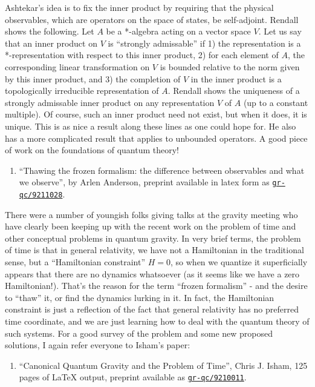 \documentclass{article}
\def\tightlist{}
\begin{document}
Ashtekar's idea is to fix the inner product by requiring that the
physical observables, which are operators on the space of states, be
self-adjoint. Rendall shows the following. Let \(A\) be a *-algebra
acting on a vector space \(V\). Let us say that an inner product on
\(V\) is ``strongly admissable'' if 1) the representation is a
*-representation with respect to this inner product, 2) for each element
of \(A\), the corresponding linear transformation on \(V\) is bounded
relative to the norm given by this inner product, and 3) the completion
of \(V\) in the inner product is a topologically irreducible
representation of \(A\). Rendall shows the uniqueness of a strongly
admissable inner product on any representation \(V\) of \(A\) (up to a
constant multiple). Of course, such an inner product need not exist, but
when it does, it is unique. This is as nice a result along these lines
as one could hope for. He also has a more complicated result that
applies to unbounded operators. A good piece of work on the foundations
of quantum theory!

\begin{enumerate}
\def\labelenumi{\arabic{enumi})}
\setcounter{enumi}{3}
\tightlist
\item
  ``Thawing the frozen formalism: the difference between observables and
  what we observe'', by Arlen Anderson, preprint available in latex form
  as
  \href{http://xxx.lanl.gov/abs/gr-qc/9211028}{\texttt{gr-qc/9211028}}.
\end{enumerate}

There were a number of youngish folks giving talks at the gravity
meeting who have clearly been keeping up with the recent work on the
problem of time and other conceptual problems in quantum gravity. In
very brief terms, the problem of time is that in general relativity, we
have not a Hamiltonian in the traditional sense, but a ``Hamiltonian
constraint'' \(H = 0\), so when we quantize it superficially appears
that there are no dynamics whatsoever (as it seems like we have a zero
Hamiltonian!). That's the reason for the term ``frozen formalism'' - and
the desire to ``thaw'' it, or find the dynamics lurking in it. In fact,
the Hamiltonian constraint is just a reflection of the fact that general
relativity has no preferred time coordinate, and we are just learning
how to deal with the quantum theory of such systems. For a good survey
of the problem and some new proposed solutions, I again refer everyone
to Isham's paper:

\begin{enumerate}
\def\labelenumi{\arabic{enumi})}
\setcounter{enumi}{4}
\tightlist
\item
  ``Canonical Quantum Gravity and the Problem of Time'', Chris J. Isham,
  125 pages of LaTeX output, preprint available as
  \href{http://xxx.lanl.gov/abs/gr-qc/9210011}{\texttt{gr-qc/9210011}}.
\end{enumerate}
\end{document}
